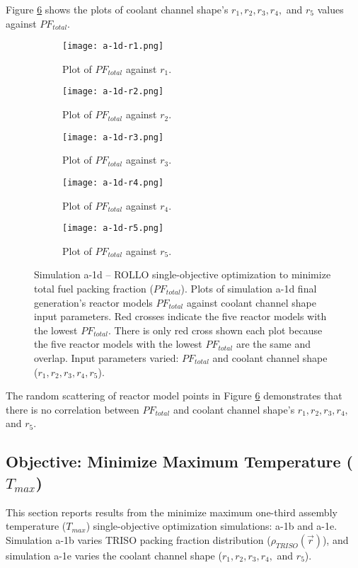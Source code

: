 Figure \ref{fig:a-1d} shows the plots of coolant channel shape's 
$r_1, r_2, r_3, r_4,$ and $r_5$ values against $PF_{total}$. 
\begin{figure}[htbp!]
    \centering
    \begin{subfigure}{0.49\textwidth}
        \texttt{[image: a-1d-r1.png]}
        \caption{Plot of $PF_{total}$ against $r_1$.}
        \label{fig:a-1d-r1} 
    \end{subfigure}
    \begin{subfigure}{0.49\textwidth}
        \texttt{[image: a-1d-r2.png]}
        \caption{Plot of $PF_{total}$ against $r_2$.}
        \label{fig:a-1d-r2} 
    \end{subfigure}
    \begin{subfigure}{0.49\textwidth}
        \texttt{[image: a-1d-r3.png]}
        \caption{Plot of $PF_{total}$ against $r_3$.}
        \label{fig:a-1d-r3} 
    \end{subfigure}
    \begin{subfigure}{0.49\textwidth}
        \texttt{[image: a-1d-r4.png]}
        \caption{Plot of $PF_{total}$ against $r_4$.}
        \label{fig:a-1d-r4} 
    \end{subfigure}
    \begin{subfigure}{0.49\textwidth}
        \texttt{[image: a-1d-r5.png]}
        \caption{Plot of $PF_{total}$ against $r_5$.}
        \label{fig:a-1d-r5} 
    \end{subfigure}
    \caption{Simulation a-1d -- ROLLO single-objective optimization to minimize 
    total fuel packing fraction ($PF_{total}$). 
    Plots of simulation a-1d final generation's reactor models $PF_{total}$ against 
    coolant channel shape input parameters. 
    Red crosses indicate the five reactor models with the lowest $PF_{total}$.
    There is only red cross shown each plot because the five reactor models with the 
    lowest $PF_{total}$ are the same and overlap.
    Input parameters varied:
    $PF_{total}$ and coolant channel shape ($r_1, r_2, r_3, r_4, r_5$).}
    \label{fig:a-1d}
\end{figure}
The random scattering of reactor model points in Figure \ref{fig:a-1d}
demonstrates that there is no correlation between $PF_{total}$ 
and coolant channel shape's $r_1, r_2, r_3, r_4,$ and $r_5$. 

\subsection{Objective: Minimize Maximum Temperature ($T_{max}$)}
\label{sec:assem-1-obj-temp}
This section reports results from the minimize maximum one-third assembly temperature 
($T_{max}$) single-objective optimization simulations: a-1b and a-1e. 
Simulation a-1b varies \gls{TRISO} packing fraction distribution 
($\rho_{TRISO}(\vec{r})$), and simulation a-1e varies the coolant channel shape
($r_1, r_2, r_3, r_4,$ and $r_5$). 

